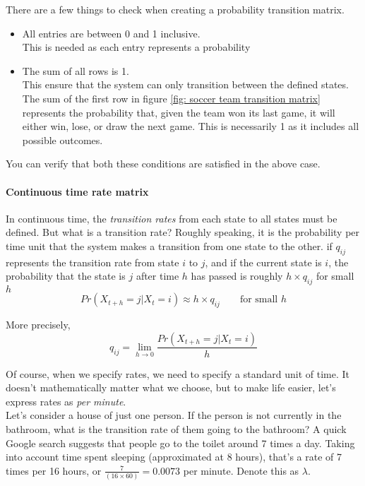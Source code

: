 There are a few things to check when creating a probability transition matrix.
\begin{itemize}
	\item All entries are between 0 and 1 inclusive.\\
	This is needed as each entry represents a probability
	\item The sum of all rows is 1.\\
	This ensure that the system can only transition between the defined states. The sum of the first row in figure \ref{fig: soccer team transition matrix} represents the probability that, given the team won its last game, it will either win, lose, or draw the next game. This is necessarily 1 as it includes all possible outcomes.
\end{itemize}
You can verify that both these conditions are satisfied in the above case.

\paragraph{Continuous time rate matrix}
In continuous time, the \textit{transition rates} from each state to all states must be defined. But what is a transition rate? Roughly speaking, it is the probability per time unit that the system makes a transition from one state to the other. 
if $q_{ij}$ represents the transition rate from state $i$ to $j$, and if the current state is $i$, the probability that the state is $j$ after time $h$ has passed is roughly $h\times q_{ij}$ for small $h$
$$ Pr(X_{t+h} = j|X_t = i) \approx h\times q_{ij} \qquad \text{for small } h$$

More precisely,
$$ q_{ij} = \lim_{h\rightarrow0}\frac{Pr(X_{t+h} = j | X_t = i)}{h} $$

\begin{comment}
	As you can imagine, the transition rate affects the expected time until the there is a transition. If the transition rate out of a state is $\lambda$, then the expected time until a transition is $\frac{1}{\lambda}$ time units.
\\
\end{comment}

Of course, when we specify rates, we need to specify a standard unit of time. It doesn't mathematically matter what we choose, but to make life easier, let's express rates as \textit{per minute}.
\\

Let's consider a house of just one person. If the person is not currently in the bathroom, what is the transition rate of them going to the bathroom? A quick Google search suggests that people go to the toilet around 7 times a day. Taking into account time spent sleeping (approximated at 8 hours), that's a rate of 7 times per 16 hours, or $\frac{7}{(16 \times 60)} = 0.0073$ per minute. Denote this as $\lambda$.

